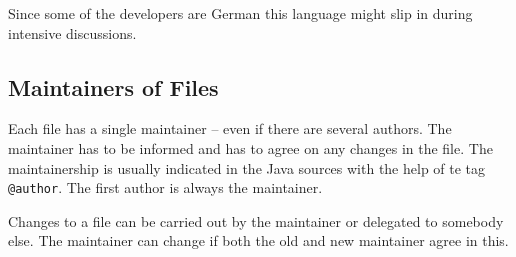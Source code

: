 Since some of the developers are German this language might slip in
during intensive discussions.


\subsection{Maintainers of Files}

Each file has a single maintainer -- even if there are several
authors. The maintainer has to be informed and has to agree on any
changes in the file. The maintainership is usually indicated in the
Java sources with the help of te tag \texttt{@author}. The first
author is always the maintainer.

Changes to a file can be carried out by the maintainer or delegated to
somebody else. The maintainer can change if both the old and new
maintainer agree in this.

